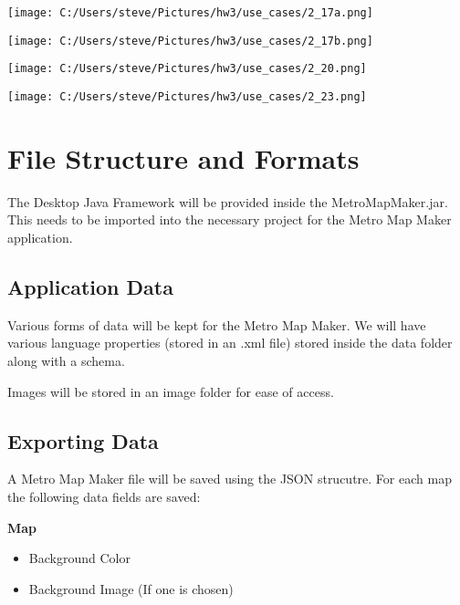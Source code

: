 \documentclass[10pt,a4paper]{article}
\begin{document}
\begin{center}
\texttt{[image: C:/Users/steve/Pictures/hw3/use\_cases/2\_17a.png]}
\end{center}

\begin{center}
\texttt{[image: C:/Users/steve/Pictures/hw3/use\_cases/2\_17b.png]}
\end{center}

\begin{center}
\texttt{[image: C:/Users/steve/Pictures/hw3/use\_cases/2\_20.png]}
\end{center}

\begin{center}
\texttt{[image: C:/Users/steve/Pictures/hw3/use\_cases/2\_23.png]}
\end{center}

\newpage

\section{File Structure and Formats}
The Desktop Java Framework will be provided inside the MetroMapMaker.jar. This needs to be imported into the necessary project for the Metro Map Maker application.
\subsection{Application Data}
Various forms of data will be kept for the Metro Map Maker. We will have various language properties (stored in an .xml file) stored inside the data folder along with a schema. \linebreak

Images will be stored in an image folder for ease of access.

\subsection{Exporting Data}
A Metro Map Maker file will be saved using the JSON strucutre. For each map the following data fields are saved: \linebreak

\textbf{Map}
\begin{itemize}
\item Background Color
\item Background Image (If one is chosen)
\end{itemize}
\end{document}
